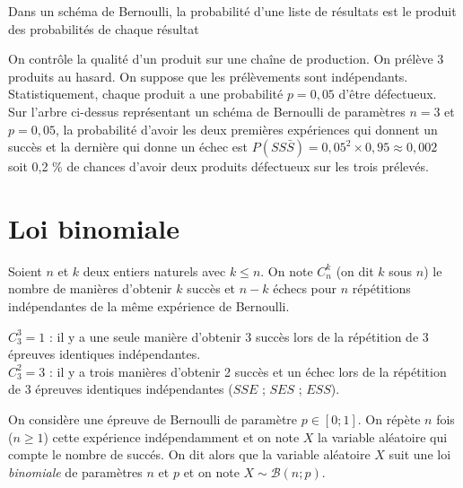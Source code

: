 \documentclass[french]{book}
\newcommand{\C}[2]{C_{#1}^{#2}}
\begin{document}
\begin{prop}
Dans un schéma de Bernoulli, la probabilité d'une liste de résultats est le produit des probabilités de chaque résultat
\end{prop}


\begin{exemple}
On contrôle la qualité d'un produit sur une chaîne de production. On prélève 3 produits au hasard. On suppose que les prélèvements sont indépendants. Statistiquement, chaque produit a une probabilité $p=0,05$ d'être défectueux.\\
Sur l'arbre ci-dessus représentant un schéma de Bernoulli de paramètres $n=3$ et $p=0,05$, la probabilité d'avoir les deux premières expériences qui donnent un succès et la dernière qui donne un échec est $P(SS\bar{S})=0,05^2\times 0,95\approx 0,002$\\
soit 0,2 \% de chances d'avoir deux produits défectueux sur les trois prélevés.
\end{exemple}

\section{Loi binomiale}


\begin{defn}
Soient $n$ et $k$ deux entiers naturels avec $k\leq n$. On note $\C{n}{k}$ (on dit \og{}$k$ sous $n$\fg{}) le nombre de manières d'obtenir $k$ succès et $n-k$ échecs pour $n$ répétitions indépendantes de la même expérience de Bernoulli. 
\end{defn}




\begin{exemple}

\noindent $\C{3}{3}=1$ : il y a une seule manière d'obtenir 3 succès lors de la répétition de 3 épreuves identiques indépendantes.\\
$\C{3}{2}=3$ : il y a trois manières d'obtenir 2 succès et un échec lors de la répétition de 3 épreuves identiques indépendantes ($SSE$ ; $SES$ ; $ESS$).
\end{exemple}

\begin{defn}
On considère une épreuve de Bernoulli de paramètre $p\in [0;1]$. On répète $n$ fois ($n\geq 1$) cette expérience indépendamment et on note $X$ la variable aléatoire qui compte le nombre de succés. On dit alors que la variable aléatoire $X$ suit une loi \emph{binomiale} de paramètres $n$ et $p$ et on note $X\sim \mathcal{B}(n;p)$.
\end{defn}
\end{document}
